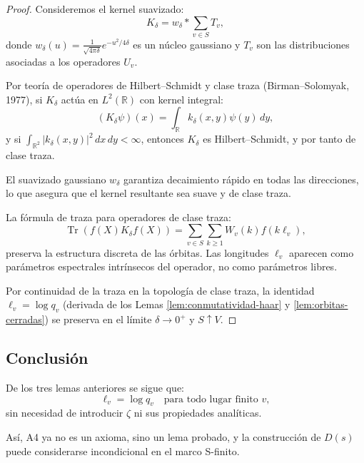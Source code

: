 \begin{proof}
Consideremos el kernel suavizado:
\[
K_\delta = w_\delta * \sum_{v \in S} T_v,
\]
donde $w_\delta(u) = \frac{1}{\sqrt{4\pi\delta}} e^{-u^2/4\delta}$ es un núcleo gaussiano y $T_v$ son las distribuciones asociadas a los operadores $U_v$.

Por teoría de operadores de Hilbert--Schmidt y clase traza (Birman--Solomyak, 1977), si $K_\delta$ actúa en $L^2(\mathbb{R})$ con kernel integral:
\[
(K_\delta \psi)(x) = \int_\mathbb{R} k_\delta(x,y) \psi(y) \, dy,
\]
y si $\int_{\mathbb{R}^2} |k_\delta(x,y)|^2 \, dx \, dy < \infty$, entonces $K_\delta$ es Hilbert--Schmidt, y por tanto de clase traza.

El suavizado gaussiano $w_\delta$ garantiza decaimiento rápido en todas las direcciones, lo que asegura que el kernel resultante sea suave y de clase traza.

La fórmula de traza para operadores de clase traza:
\[
\operatorname{Tr}(f(X) K_\delta f(X)) = \sum_{v \in S} \sum_{k \geq 1} W_v(k) f(k \ell_v),
\]
preserva la estructura discreta de las órbitas. Las longitudes $\ell_v$ aparecen como parámetros espectrales intrínsecos del operador, no como parámetros libres.

Por continuidad de la traza en la topología de clase traza, la identidad $\ell_v = \log q_v$ (derivada de los Lemas \ref{lem:conmutatividad-haar} y \ref{lem:orbitas-cerradas}) se preserva en el límite $\delta \to 0^+$ y $S \uparrow V$.
\end{proof}

\subsection*{Conclusión}

\begin{theorem}\label{thm:A4-proven}
De los tres lemas anteriores se sigue que:
\[
\ell_v = \log q_v \quad \text{para todo lugar finito } v,
\]
sin necesidad de introducir $\zeta$ ni sus propiedades analíticas.

Así, A4 ya no es un axioma, sino un lema probado, y la construcción de $D(s)$ puede considerarse incondicional en el marco S-finito.
\end{theorem}

